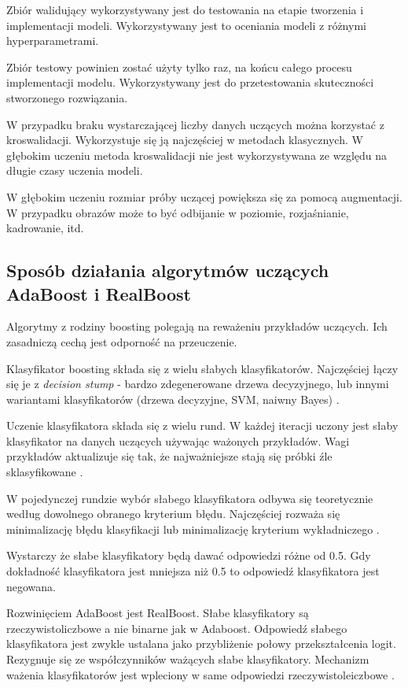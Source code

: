 \documentclass[wi]{zut}
\begin{document}
Zbiór walidujący wykorzystywany jest do testowania na etapie tworzenia i implementacji modeli. Wykorzystywany jest to oceniania modeli z różnymi hyperparametrami. 

Zbiór testowy powinien zostać użyty tylko raz, na końcu całego procesu implementacji modelu. Wykorzystywany jest do przetestowania skuteczności stworzonego rozwiązania. 

W przypadku braku wystarczającej liczby danych uczących można korzystać z kroswalidacji. Wykorzystuje się ją najczęściej w metodach klasycznych. W głębokim uczeniu metoda kroswalidacji nie jest wykorzystywana ze względu na długie czasy uczenia modeli.

W głębokim uczeniu rozmiar próby uczącej powiększa się za pomocą augmentacji. W przypadku obrazów może to być odbijanie w poziomie, rozjaśnianie, kadrowanie, itd.

\subsection{Sposób działania algorytmów uczących AdaBoost i RealBoost}

Algorytmy z rodziny boosting polegają na reważeniu przykładów uczących. Ich zasadniczą cechą jest odporność na przeuczenie.

Klasyfikator boosting składa się z wielu słabych klasyfikatorów. Najczęściej łączy się je z \emph{decision stump} - bardzo zdegenerowane drzewa decyzyjnego, lub innymi wariantami klasyfikatorów (drzewa decyzyjne, SVM, naiwny Bayes) \cite{Klesk2020}.

Uczenie klasyfikatora składa się z wielu rund. W każdej iteracji uczony jest słaby klasyfikator na danych uczących używając ważonych przykładów. Wagi przykładów aktualizuje się tak, że najważniejsze stają się próbki źle sklasyfikowane \cite{Klesk2020}.

W pojedynczej rundzie wybór słabego klasyfikatora odbywa się teoretycznie według dowolnego obranego kryterium błędu. Najczęściej rozważa się minimalizację błędu klasyfikacji lub minimalizację kryterium wykładniczego \cite{Klesk2020}.

Wystarczy że słabe klasyfikatory będą dawać odpowiedzi różne od 0.5. Gdy dokładność klasyfikatora jest mniejsza niż 0.5 to odpowiedź klasyfikatora jest negowana.

Rozwinięciem AdaBoost jest RealBoost. Słabe klasyfikatory są rzeczywistoliczbowe a nie binarne jak w Adaboost. Odpowiedź słabego klasyfikatora jest zwykle ustalana jako przybliżenie połowy przekształcenia logit. Rezygnuje się ze współczynników ważących słabe klasyfikatory. Mechanizm ważenia klasyfikatorów jest wpleciony w same odpowiedzi rzeczywistoleiczbowe \cite{Klesk2020}.
\question
\end{document}
